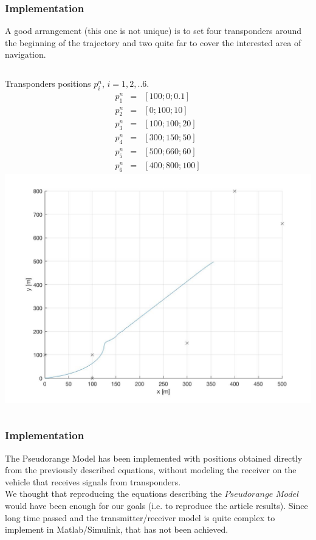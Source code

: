 \documentclass{beamer}
\begin{document}
 \begin{frame}
        \frametitle{Implementation}
		A good arrangement (this one is not unique) is to set four transponders around the beginning of the trajectory and two quite far to cover the interested area of navigation.\\
        
        \begin{columns}
        Transponders positions $p_i^n$, $i=1,2,.. 6$.
        $$
        \begin{matrix}
            p_1^n& =& [100;0;0.1] \\
            p_2^n& =& [0;100;10] \\
            p_3^n &=& [100;100;20] \\
            p_4^n &=& [300;150;50] \\
            p_5^n &=& [500;660;60] \\
            p_6^n &=& [400;800;100]
        \end{matrix}
        $$
			\includegraphics[scale=0.15]{true_traj.jpg}
		\end{columns}
    \end{frame}
    
      \begin{frame}
        	\frametitle{Implementation}
        	The Pseudorange Model has been implemented with positions obtained directly from the previously described equations, without modeling the receiver on the vehicle that receives signals from transponders.\\
        	We thought that reproducing the equations describing the $Pseudorange$ $Model$ would have been enough for our goals (i.e. to reproduce the article results). Since long time passed and the transmitter/receiver model is quite complex to implement in Matlab/Simulink, that has not been achieved.  
      \end{frame}
    
\end{document}
